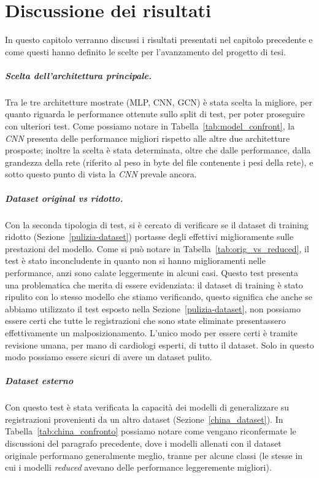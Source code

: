 \chapter{Discussione dei risultati}
\label{chap8}
In questo capitolo verranno discussi i risultati presentati nel capitolo precedente e come questi hanno definito le scelte per l'avanzamento del progetto di tesi.

\paragraph{Scelta dell'architettura principale.} Tra le tre architetture mostrate (MLP, CNN, GCN) è stata scelta la migliore, per quanto riguarda le performance ottenute sullo split di test, per poter proseguire con ulteriori test.
Come possiamo notare in Tabella~\ref{tab:model_confront}, la \emph{CNN} presenta delle performance migliori rispetto alle altre due architetture prosposte; inoltre la scelta è stata determinata, oltre che dalle performance, dalla grandezza della rete (riferito al peso in byte del file contenente i pesi della rete), e sotto questo punto di vista la \emph{CNN} prevale ancora.

\paragraph{Dataset \emph{original} vs \emph{ridotto}.} Con la seconda tipologia di test, si è cercato di verificare se il dataset di training ridotto (Sezione~\ref{pulizia-dataset}) portasse degli effettivi miglioramente sulle prestazioni del modello.
Come si può notare in Tabella~\ref{tab:orig_vs_reduced}, il test è stato inconcludente in quanto non si hanno miglioramenti nelle performance, anzi sono calate leggermente in alcuni casi. 
Questo test presenta una problematica che merita di essere evidenziata: il dataset di training è stato ripulito con lo stesso modello che stiamo verificando, questo significa che anche se abbiamo utilizzato il test esposto nella Sezione~\ref{pulizia-dataset}, non possiamo essere certi che tutte le registrazioni che sono state eliminate presentassero effettivamente un malposizionamento. L'unico modo per essere certi è tramite revisione umana, per mano di cardiologi esperti, di tutto il dataset. Solo in questo modo possiamo essere sicuri di avere un dataset pulito.

\paragraph{Dataset esterno}
Con questo test è stata verificata la capacità dei modelli di generalizzare su registrazioni provenienti da un altro dataset (Sezione~\ref{china_dataset}). In Tabella~\ref{tab:china_confronto} possiamo notare come vengano riconfermate le discussioni del paragrafo precedente, dove i modelli allenati con il dataset originale performano generalmente meglio, tranne per alcune classi (le stesse in cui i modelli \emph{reduced} avevano delle performance leggeremente migliori).

